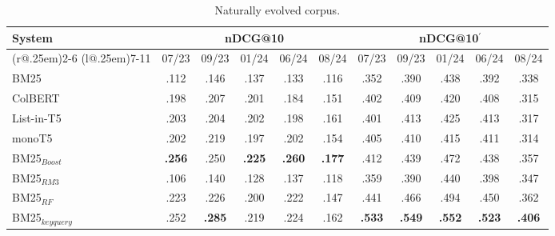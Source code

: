 \begin{table}[t]
\small
\centering
\renewcommand{\tabcolsep}{3.2pt}
\caption{Naturally evolved corpus.}
\label{tab:table-results}

\begin{tabular}{@{}l@{}cccccccccc@{}}
    \toprule
    \bfseries System & \multicolumn{5}{c}{\bfseries nDCG@10} & \multicolumn{5}{c}{\bfseries nDCG@10$^{'}$}\\
    \cmidrule(r@{.25em}){2-6}
    \cmidrule(l@{.25em}){7-11}
    
    & 07/23 & 09/23 & 01/24 & 06/24 & 08/24 & 07/23 & 09/23 & 01/24 & 06/24 & 08/24\\
    
    \midrule

    BM25 & .112 & .146 & .137 & .133 & .116 & .352 & .390 & .438 & .392 & .338 \\
    ColBERT & .198 & .207 & .201 & .184 & .151 & .402 & .409 & .420 & .408 & .315 \\
    List-in-T5 & .203 & .204 & .202 & .198 & .161 & .401 & .413 & .425 & .413 & .317 \\
    monoT5 & .202 & .219 & .197 & .202 & .154 & .405 & .410 & .415 & .411 & .314 \\
    
    \midrule
    
    BM25$_{Boost}$ & \bfseries .256 & .250 & \bfseries .225 & \bfseries .260 & \bfseries .177 & .412 & .439 & .472 & .438 & .357 \\
    BM25$_{RM3}$ & .106 & .140 & .128 & .137 & .118 & .359 & .390 & .440 & .398 & .347 \\
    BM25$_{RF}$ & .223 & .226 & .200 & .222 & .147 & .441 & .466 & .494 & .450 & .362 \\
    BM25$_{keyquery}$ & .252 & \bfseries .285 & .219 & .224 & .162 & \bfseries .533 & \bfseries .549 & \bfseries .552 & \bfseries .523 & \bfseries .406 \\

\bottomrule
\end{tabular}
\end{table}
